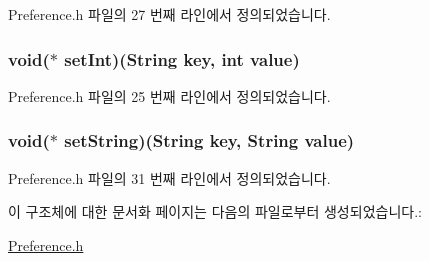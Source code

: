 Preference.\-h 파일의 27 번째 라인에서 정의되었습니다.

\hypertarget{struct___preference_aa764bbce5aed489d6d513185620475e3}{
\subsubsection[{set\-Int}]{\setlength{\rightskip}{0pt plus 5cm}void($\ast$  set\-Int)({\bf String} key, int value)}}\label{struct___preference_aa764bbce5aed489d6d513185620475e3}


Preference.\-h 파일의 25 번째 라인에서 정의되었습니다.

\hypertarget{struct___preference_a0335e1a950110bafc47fab3849396e74}{
\subsubsection[{set\-String}]{\setlength{\rightskip}{0pt plus 5cm}void($\ast$  set\-String)({\bf String} key, {\bf String} value)}}\label{struct___preference_a0335e1a950110bafc47fab3849396e74}


Preference.\-h 파일의 31 번째 라인에서 정의되었습니다.



이 구조체에 대한 문서화 페이지는 다음의 파일로부터 생성되었습니다.\-:\begin{DoxyCompactItemize}
\item 
\hyperlink{_preference_8h}{Preference.\-h}\end{DoxyCompactItemize}

